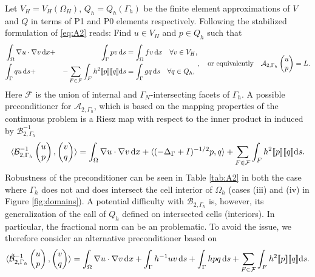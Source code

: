 Let $V_H=V_H(\Omega_H)$, $Q_h=Q_h(\Gamma_h)$ be the finite element approximations
of $V$ and $Q$ in terms of P1 and P0 elements respectively. Following \cite{burman2014projection}
the stabilized formulation of \eqref{eq:A2} reads: Find $u \in V_H$ and
$p \in Q_h$ such that
%
\[
\begin{aligned}
  &\int_{\Omega}\nabla u\cdot\nabla v\,\mathrm{d}x + &{\int_{\Gamma}p v\,\mathrm{d}s} &= \int_{\Omega}f v\,\mathrm{d}x\quad\forall v\in V_H,\\
  &{\int_{\Gamma}q u\,\mathrm{d}s} + &-\sum_{F\in\mathcal{F}}\int_{F}h^2[\![p]\!][\![q]\!] \mathrm{d}s &= \int_{\Gamma}g q\,\mathrm{d}s\quad\forall q\in Q_h,\\
\end{aligned},
\quad\mbox{or equivalently}\quad
\mathcal{A}_{2, \Gamma_h}\begin{pmatrix}u\\p\\\end{pmatrix} = L.
\]
%
Here $\mathcal{F}$ is the union of internal and $\Gamma_N$-intersecting
facets of $\Gamma_h$. A possible preconditioner for $\mathcal{A}_{2,\Gamma_h}$,
which is based on the mapping properties of the continuous problem is a Riesz
map with respect to the inner product in induced by $\mathcal{B}^{-1}_{2, \Gamma_h}$
\[
\langle
\mathcal{B}^{-1}_{2, \Gamma_h}\begin{pmatrix}u\\p\end{pmatrix},
  \begin{pmatrix}v\\q\end{pmatrix}
\rangle
    =
    \int_{\Omega}\nabla u\cdot\nabla v\,\mathrm{d}x + \langle(-\Delta_{\Gamma}+I)^{-1/2}p, q\rangle
    + \sum_{F\in\mathcal{F}}\int_{F}h^2[\![p]\!][\![q]\!] \mathrm{d}s.
\]
Robustness of the preconditioner can be seen in Table \ref{tab:A2} in both
the case where $\Gamma_h$ does not and does intersect the cell interior of $\Omega_h$ (cases
(iii) and (iv) in Figure \ref{fig:domains}). A potential difficulty with
$\mathcal{B}_{2, \Gamma_h}$ is, however, its generalization of the call of $Q_h$ defined
on intersected cells (interiors). In particular, the fractional norm can be
an problematic. To avoid the issue, we therefore consider an alternative
preconditioner based on \cite[\S 4.A]{burman2014projection}
\[
\langle
\tilde{\mathcal{B}}^{-1}_{2, \Gamma_h}\begin{pmatrix}u\\p\end{pmatrix},
  \begin{pmatrix}v\\q\end{pmatrix}
\rangle
    =
    \int_{\Omega}\nabla u\cdot\nabla v\,\mathrm{d}x + \int_{\Gamma}h^{-1}u v\,\mathrm{d}s + \int_{\Gamma} h p q\,\mathrm{d}s
    + \sum_{F\in\mathcal{F}}\int_{F}h^2[\![p]\!][\![q]\!] \mathrm{d}s.
\]

